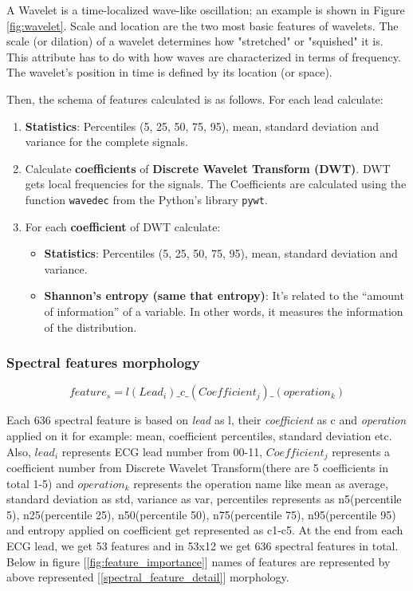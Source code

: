 A Wavelet is a time-localized wave-like oscillation; an example is shown in Figure \ref{fig:wavelet}. Scale and location are the two most basic features of wavelets. The scale (or dilation) of a wavelet determines how "stretched" or "squished" it is. This attribute has to do with how waves are characterized in terms of frequency. The wavelet's position in time is defined by its location (or space).

Then, the schema of features calculated is as follows. For each lead calculate:

\begin{enumerate}
    \item \textbf{Statistics}: Percentiles (5, 25, 50, 75, 95), mean, standard deviation and variance for the complete signals.
    
    \item Calculate \textbf{coefficients} of \textbf{Discrete Wavelet Transform (DWT)}. DWT gets local frequencies for the signals. The Coefficients are calculated using the function \texttt{wavedec} from the Python’s library \texttt{pywt}.
    
    \item For each \textbf{coefficient} of DWT calculate:
    \begin{itemize}
        \item \textbf{Statistics}: Percentiles (5, 25, 50, 75, 95), mean, standard deviation and variance.
        
        \item \textbf{Shannon’s entropy (same that entropy)}: It’s related to the “amount of information” of a variable. In other words, it measures the information of the distribution.
    \end{itemize}
\end{enumerate}


\subsubsection{Spectral features morphology}

\begin{equation} \label{spectral_feature_detail}
feature_s = l(Lead_i)\_c\_(Coefficient_j)\_(operation_k)
\end{equation}

Each 636 spectral feature is based on \textit{lead} as l, their \textit{coefficient} as c and \textit{operation} applied on it for example: mean, coefficient percentiles, standard deviation etc. Also, $lead_i$ represents ECG lead number from 00-11, $Coefficient_j$ represents a coefficient number from Discrete Wavelet Transform(there are 5 coefficients in total 1-5) and $operation_k$ represents the operation name like mean as average, standard deviation as std, variance as var, percentiles represents as n5(percentile 5), n25(percentile 25), n50(percentile 50), n75(percentile 75), n95(percentile 95) and entropy applied on coefficient get represented as c1-c5. At the end from each ECG lead, we get 53 features and in 53x12 we get 636 spectral features in total. Below in figure [\ref{fig:feature_importance}] names of features are represented by above represented [\ref{spectral_feature_detail}] morphology. 


